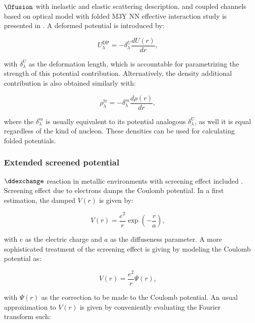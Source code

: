 \documentclass[openany]{book}
\begin{document}
$\Ofusion$ with  inelastic and elastic scattering description.  and coupled channels based on optical model with folded M3Y NN effective interaction study is presented in \cite{hassanain_al_sebiey_2014}. A deformed potential is introduced by: 

\begin{equation}\label{eq:potential_deformed}
	U^{\mathrm{DP}}_\lambda = - \delta^{U}_\lambda \frac{dU(r)}{dr},
\end{equation} 

with $\delta^{U}_\lambda$ as the deformation length, which is accountable for parametrizing the strength of this potential contribution. Alternatively, the density additional contribution is also obtained similarly with: 

\begin{equation}\label{eq:potential_deformed_density}
	\rho^{\mathrm{tr}}_\lambda = - \delta^{m}_\lambda \frac{d\rho(r)}{dr},
\end{equation} 

where the $\delta^{m}_\lambda$ is usually equivalent to its potential analogous $\delta^{U}_\lambda$, as well it is equal regardless of the kind of nucleon. These densities can be used for calculating folded potentials. \\


\subsubsection{Extended screened potential}

$\mathrm{\ddexchange}$ reaction in metallic environments with screening effect included \cite{czerski_huke_heide_ruprecht_2006}. Screening effect due to electrons damps the Coulomb potential. In a first estimation, the damped $V(r)$ is given by:

\begin{equation}\label{eq:potential_screening_simple}
	V(r) = \frac{e^2}{r} \exp {\left( - \frac{r}{a}\right)},
\end{equation}

with $e$ as the electric charge and $a$ as the diffuseness parameter. A more sophisticated treatment of the screening effect is giving by modeling the Coulomb potential as:

\begin{equation}\label{eq:potential_screening}
	V(r) = \frac{e^2}{r} \Psi(r),
\end{equation}

with $\Psi(r)$ as the correction to be made to the Coulomb potential. An usual approximation to $V(r)$ is given by conveniently evaluating the Fourier transform such:
\end{document}
